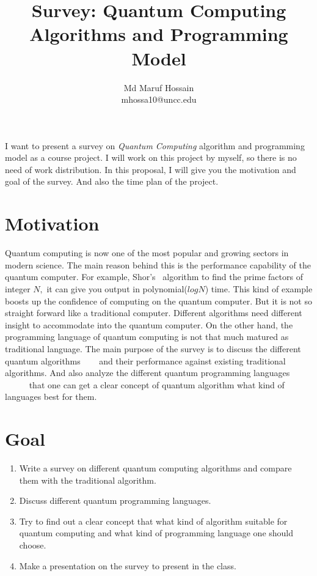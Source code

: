 \documentclass[a4paper,10pt]{article}
\title{Survey: Quantum Computing Algorithms and Programming Model}
\author[]{Md Maruf Hossain \\ mhossa10@uncc.edu}
\affil[]{Department of Computer Science, UNC Charlotte}
\date{}
\begin{document}
\maketitle

I want to present a survey on \textit{Quantum Computing} algorithm and programming model as a course project.
I will work on this project by myself, so there is no need of work distribution. In this proposal, 
I will give you the motivation and goal of the survey. And also the time plan of the project. 

\section{Motivation}
Quantum computing is now one of the most popular and growing sectors in modern science. The main reason behind this 
is the performance capability of the quantum computer. For example, Shor's~\cite{shor1994algorithms} algorithm to find 
the prime factors of integer $N,$ it can give you output in polynomial($log N$) time. This kind of example boosts up the 
confidence of computing on the quantum computer. But it is not so straight forward like a traditional computer. Different algorithms 
need different insight to accommodate into the quantum computer. On the other hand, the programming language 
of quantum computing is not that much matured as traditional language. The main purpose of the survey is to discuss 
the different quantum algorithms ~\cite{shor1994algorithms}~\cite{simon1997power}~\cite{gall2014improved}
and their performance against existing traditional algorithms. And also analyze the different quantum programming languages 
~\cite{knill1996conventions}~\cite{selinger2004towards}~\cite{bettelli2003toward}~\cite{omer1998procedural}~\cite{sanders2000quantum} 
that one can get a clear concept of quantum algorithm what kind of languages best for them.

\section{Goal}
\begin{enumerate}
\item Write a survey on different quantum computing algorithms and compare them with the traditional algorithm.
\item Discuss different quantum programming languages.
\item Try to find out a clear concept that what kind of algorithm suitable for quantum computing and what kind 
of programming language one should choose.
\item Make a presentation on the survey to present in the class.
\end{enumerate}
\end{document}
